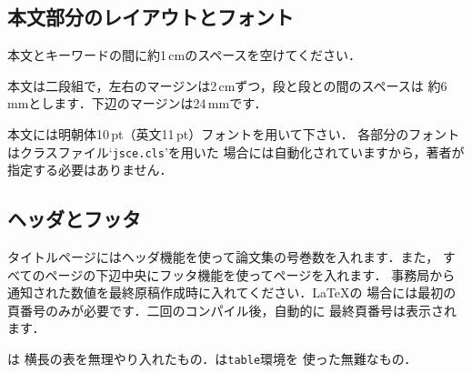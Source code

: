 \documentclass{jsce}
\begin{document}
\subsection{本文部分のレイアウトとフォント}

本文とキーワードの間に約1\,cmのスペースを空けてください．

本文は二段組で，左右のマージンは2\,cmずつ，段と段との間のスペースは
約6\,mmとします．下辺のマージンは24\,mmです．

本文には明朝体10\,pt（英文11\,pt）フォントを用いて下さい．
各部分のフォントはクラスファイル`{\tt jsce.cls}'を用いた
場合には自動化されていますから，著者が指定する必要はありません．

\subsection{ヘッダとフッタ}

タイトルページにはヘッダ機能を使って論文集の号巻数を入れます．また，
すべてのページの下辺中央にフッタ機能を使ってページを入れます．
事務局から通知された数値を最終原稿作成時に入れてください．\LaTeX の
場合には最初の頁番号のみが必要です．二回のコンパイル後，自動的に
最終頁番号は表示されます．


\tabno{\ref{tab:landscape}, \ref{tab:landscape2}}は
横長の表を無理やり入れたもの．\tabno{\ref{tab:landscape3},
 \ref{tab:landscape1}}は{\tt table}環境を
使った無難なもの．

\onecolumn
\landscape
\thispagestyle{empty} %
\mbox{} %
\vfill
\end{document}
